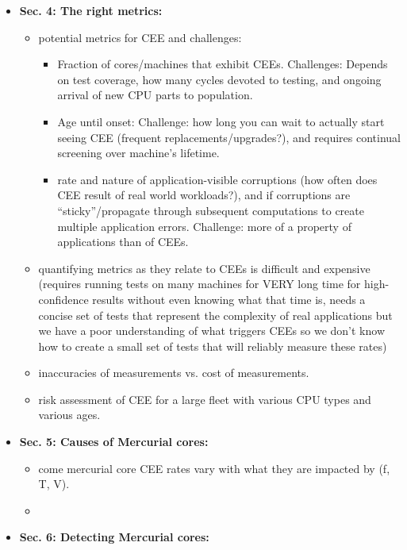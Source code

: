 \documentclass [12pt]{article}
\begin{document}
\begin{itemize}
            \item \textbf{Sec. 4: The right metrics:}
                \begin{itemize}
                    \item potential metrics for CEE and challenges:
                        \begin{itemize}
                            \item Fraction of cores/machines that exhibit CEEs. Challenges: Depends on test coverage, how many cycles devoted to testing, and ongoing arrival of new CPU parts to population.
                            \item   Age until onset: Challenge: how long you can wait to actually start seeing CEE (frequent replacements/upgrades?), and requires continual screening over machine's lifetime. 
                            \item rate and nature of application-visible corruptions (how often does CEE result of real world workloads?), and if corruptions are ``sticky''/propagate through subsequent computations to create multiple application errors. Challenge: more of a property of applications than of CEEs. 
                        \end{itemize}
                \item quantifying metrics as they relate to CEEs is difficult and expensive (requires running tests on many machines for VERY long time for high-confidence results without even knowing what that time is, needs a concise set of tests that represent the complexity of real applications but we have a poor understanding of what triggers CEEs so we don't know how to create a small set of tests that will reliably measure these rates)
                \item inaccuracies of measurements vs. cost of measurements. 
                \item risk assessment of CEE for a large fleet with various CPU types and various ages. 
            \end{itemize}
            \item \textbf{Sec. 5: Causes of Mercurial cores:}
                \begin{itemize}
                    \item come mercurial core CEE rates vary with what they are impacted by (f, T, V).
                    \item 
                \end{itemize}
            \item \textbf{Sec. 6: Detecting Mercurial cores:}

\end{itemize}
\end{document}
